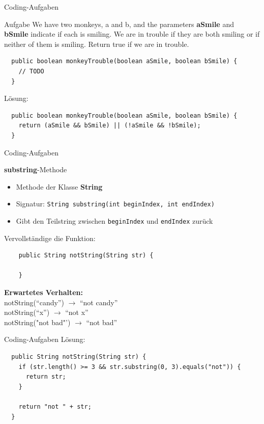 \documentclass[18pt]{beamer}
\begin{document}
\begin{frame}[fragile]{Coding-Aufgaben}
	\begin{block}{Aufgabe}
    We have two monkeys, a and b, and the parameters \textbf{aSmile} and \textbf{bSmile} indicate if each is smiling. We are in trouble if they are both smiling or if neither of them is smiling. Return true if we are in trouble. 
  \end{block}
  \begin{lstlisting}
  public boolean monkeyTrouble(boolean aSmile, boolean bSmile) {
    // TODO
  }
  \end{lstlisting}
  \pause
  Lösung:
  \begin{lstlisting}
  public boolean monkeyTrouble(boolean aSmile, boolean bSmile) {
    return (aSmile && bSmile) || (!aSmile && !bSmile);
  }
  \end{lstlisting}
\end{frame}

\begin{frame}[fragile]{Coding-Aufgaben}
	\begin{block}{\textbf{substring}-Methode}
    \begin{itemize}
      \item Methode der Klasse \textbf{String}
      \item Signatur: \lstinline$String substring(int beginIndex, int endIndex)$
      \item Gibt den Teilstring zwischen \lstinline$beginIndex$ und \lstinline$endIndex$ zurück
    \end{itemize}
  \end{block}
  \pause
  Vervollständige die Funktion:
  \begin{lstlisting}
    public String notString(String str) {
  
    }\end{lstlisting}
  \textbf{Erwartetes Verhalten:}\\
  notString("`candy"') $\rightarrow$ "`not candy"'\\
  notString("`x"') $\rightarrow$ "`not x"'\\
  notString("not bad"') $\rightarrow$ "`not bad"'\\
\end{frame}

\begin{frame}[fragile]{Coding-Aufgaben}
	Lösung:
  \begin{lstlisting}
  public String notString(String str) {
    if (str.length() >= 3 && str.substring(0, 3).equals("not")) {
      return str;
    }

    return "not " + str;
  }\end{lstlisting}
\end{frame}
\end{document}
